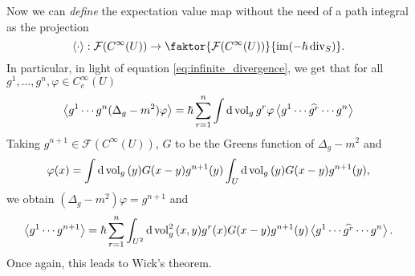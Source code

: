Now we can \textit{define} the expectation value map without the need of a path integral as the projection
\begin{equation}
\ev{\cdot}:\mathcal{F}(C^\infty(U))\rightarrow\faktor{\mathcal{F}(C^\infty(U))}{\im (-\hbar\Div_S)}.
\end{equation}
In particular, in light of equation \eqref{eq:infinite_divergence}, we get that for all $g^1,\dots,g^n,\varphi\in C^\infty_c(U)$
\begin{equation}
\ev{g^1\cdots g^n(\Delta_g-m^2)\varphi}=\hbar\sum_{r=1}^n\int\dd{\vol_g}g^r\varphi\ev{g^1\cdots\widehat{g^r}\cdots g^n}
\end{equation}
Taking $g^{n+1}\in\mathcal{F}(C^\infty(U))$, $G$ to be the Greens function of $\Delta_g-m^2$ and 
\begin{equation}
\varphi(x)=\int\dd{\operatorname{vol}_g}(y)G(x-y)g^{n+1}(y)\int_U\dd{\operatorname{vol}_g}(y)G(x-y)g^{n+1}(y),
\end{equation}
we obtain $(\Delta_g-m^2)\varphi=g^{n+1}$ and 
\begin{equation}
\ev{g^1\cdots g^{n+1}}=\hbar\sum_{r=1}^n\int_{U^2}\dd{\vol_g^2}(x,y)g^r(x)G(x-y)g^{n+1}(y)\ev{g^1\cdots\widehat{g^r}\cdots g^n}.
\end{equation}
Once again, this leads to Wick's theorem.
